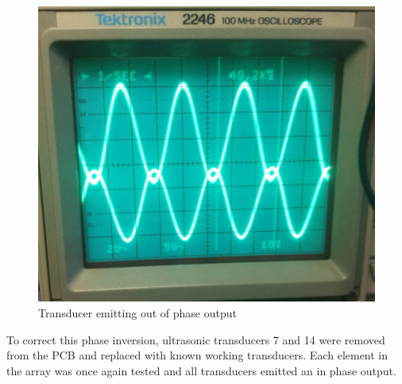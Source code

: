 \begin{figure}[ht!]
\begin{minipage}{0.49\textwidth}
    \includegraphics[width= \textwidth]{Figures/Implementation/TransducerArray/phaseInversion.png}
    \caption{Transducer emitting out of phase output}
    \label{fig:outphaseTran}
    \end{minipage}
    
\end{figure}

To correct this phase inversion, ultrasonic transducers 7 and 14 were removed from the PCB and replaced with known working transducers. Each element in the array was once again tested and all transducers emitted an in phase output.
\newpage
